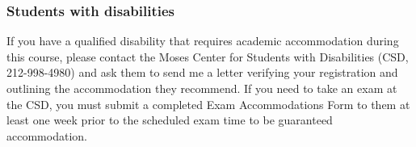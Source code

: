 \subsubsection*{Students with disabilities}

If you have a qualified disability that requires academic accommodation during this course,
please contact the Moses Center for Students with Disabilities (CSD, 212-998-4980) and ask them to
send me a letter verifying your registration and outlining the accommodation they recommend.
If you need to take an exam at the CSD, you must submit a completed Exam Accommodations Form to them
at least one week prior to the scheduled exam time to be guaranteed accommodation.


%



